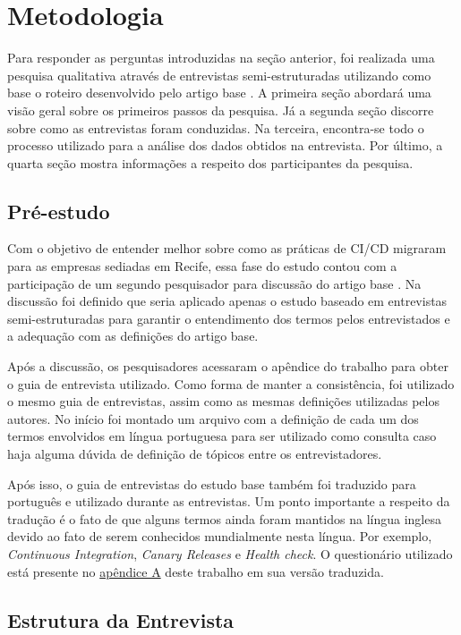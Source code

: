 
\chapter{Metodologia}

Para responder as perguntas introduzidas na seção anterior, foi realizada uma pesquisa qualitativa através de entrevistas semi-estruturadas utilizando como base o roteiro desenvolvido pelo artigo base \cite{empiricalStudy2016}. A primeira seção abordará uma visão geral sobre os primeiros passos da pesquisa.  Já a segunda seção discorre sobre como as entrevistas foram conduzidas. Na terceira, encontra-se todo o processo utilizado para a análise dos dados obtidos na entrevista. Por último, a quarta seção mostra informações a respeito dos participantes da pesquisa.


\section{Pré-estudo}

Com o objetivo de entender melhor sobre como as práticas de CI/CD migraram para as empresas sediadas em Recife, essa fase do estudo contou com a participação de um segundo pesquisador para discussão do artigo base \cite{empiricalStudy2016}. Na discussão foi definido que seria aplicado apenas o estudo baseado em entrevistas semi-estruturadas para garantir o entendimento dos termos pelos entrevistados e a adequação com as definições do artigo base. 

Após a discussão, os pesquisadores acessaram o apêndice do trabalho para obter o guia de entrevista utilizado. Como forma de manter a consistência, foi utilizado o mesmo guia de entrevistas, assim como as mesmas definições utilizadas pelos autores. No início foi montado um arquivo com a definição de cada um dos termos envolvidos em língua portuguesa para ser utilizado como consulta caso haja alguma dúvida de definição de tópicos entre os entrevistadores.

Após isso, o guia de entrevistas do estudo base também foi traduzido para português e utilizado durante as entrevistas. Um ponto importante a respeito da tradução é o fato de que alguns termos ainda foram mantidos na língua inglesa devido ao fato de serem conhecidos mundialmente nesta língua. Por exemplo, \emph{Continuous Integration}, \emph{Canary Releases} e \emph{Health check}. O questionário utilizado está presente no \hyperlink{questionario}{apêndice A} deste trabalho em sua versão traduzida.

\section{Estrutura da Entrevista}

